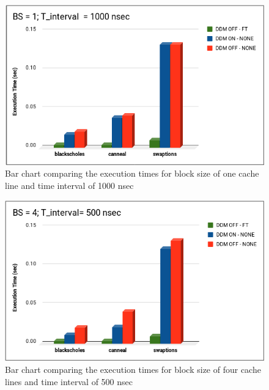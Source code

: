 \documentclass{listhesis}
\begin{document}
\begin{figure}
  \includegraphics[width=\linewidth]{Bla_cann_Swap_BS_1_T_1000.png}
  \centering
  \caption{Bar chart comparing the execution times for block size of one cache line and time interval of 1000 nsec}
  \label{fig:Bla_cann_Swap_BS_1_T_1000.png}
\end{figure}

\begin{figure}
  \includegraphics[width=\linewidth]{Bla_cann_Swap_BS_4_T_500.png}
  \centering
  \caption{Bar chart comparing the execution times for block size of four cache lines and time interval of 500 nsec}
  \label{fig:Bla_cann_Swap_BS_4_T_500.png}
\end{figure}
\end{document}
